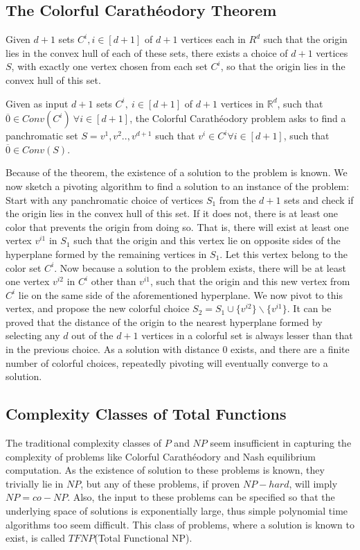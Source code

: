 \documentclass[a4paper,11pt]{article}
\def\CC{Colorful Carath\'eodory }
\begin{document}
\subsection{The \CC Theorem}
\begin{theorem}
  Given $d+1$ sets $C^i, i \in [d+1]$ of $d+1$ vertices each in $R^d$ such that the origin lies in the convex hull of each of these sets, there exists a choice of $d+1$ vertices $S$, with exactly one vertex chosen from each set $C^i$, so that the origin lies in the convex hull of this set. 
\end{theorem}

\begin{definition}[\CC]
Given as input $d+1$ sets $C^i,\ i \in [d+1]$ of $d+1$ vertices in $\mathbb{R}^d$, such that $\overline{0}\in Conv(C^i)\ \forall i\in[d+1]$, the \CC problem asks to find a panchromatic set $S={v^1,v^2..,v^{d+1}}$ such that $v^i\in C^i \forall i \in [d+1]$, such that $\overline{0}\in Conv(S)$.
\end{definition}

Because of the theorem, the existence of a solution to the problem is known. We now sketch a pivoting algorithm to find a solution to an instance of the problem: Start with any panchromatic choice of vertices $S_1$ from the $d+1$ sets and check if the origin lies in the convex hull of this set. If it does not, there is at least one color that prevents the origin from doing so. That is, there will exist at least one vertex $v^{i1}$ in $S_1$ such that the origin and this vertex lie on opposite sides of the hyperplane formed by the remaining vertices in $S_1$. Let this vertex belong to the color set $C^i$. Now because a solution to the problem exists, there will be at least one vertex $v^{i2}$ in $C^i$ other than $v^{i1}$, such that the origin and this new vertex from $C^i$ lie on the same side of the aforementioned hyperplane. We now pivot to this vertex, and propose the new colorful choice $S_2=S_1\cup \{v^{i2}\}\backslash \{v^{i1}\}$. It can be proved that the distance of the origin to the nearest hyperplane formed by selecting any $d$ out of the $d+1$ vertices in a colorful set is always lesser than that in the previous choice. As a solution with distance $0$ exists, and there are a finite number of colorful choices, repeatedly pivoting will eventually converge to a solution.

\subsection{Complexity Classes of Total Functions}
The traditional complexity classes of $P$ and $NP$ seem insufficient in capturing the complexity of problems like \CC and Nash equilibrium computation. As the existence of solution to these problems is known, they trivially lie in $NP$, but any of these problems, if proven $NP-hard$, will imply $NP=co-NP$\cite{CP}. Also, the input to these problems can be specified so that the underlying space of solutions is exponentially large, thus simple polynomial time algorithms too seem difficult. This class of problems, where a solution is known to exist, is called $TFNP$(Total Functional NP). 
\end{document}
